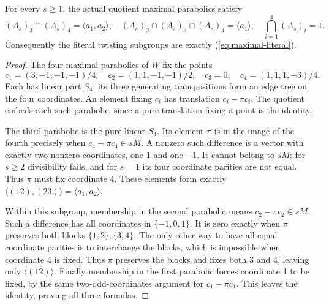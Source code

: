 \begin{lemma}\label{lem:literal}
For every $s\geq1$, the actual quotient maximal parabolics satisfy
\[
 (A_s)_3\cap(A_s)_4=\langle a_1,a_2\rangle,\quad
 (A_s)_2\cap(A_s)_3\cap(A_s)_4=\langle a_1\rangle,\quad
 \bigcap_{i=1}^4(A_s)_i=1.
\]
Consequently the literal twisting subgroups are exactly
(\ref{eq:maximal-literal}).
\end{lemma}
\begin{proof}
The four maximal parabolics of $W$ fix the points
\[
 c_1=(3,-1,-1,-1)/4,\quad c_2=(1,1,-1,-1)/2,
 \quad c_3=0,\quad c_4=(1,1,1,-3)/4.
\]
Each has linear part $S_4$: its three generating transpositions form
an edge tree on the four coordinates. An element fixing $c_i$ has
translation $c_i-\pi c_i$. The quotient embeds each such parabolic,
since a pure translation fixing a point is the identity.

The third parabolic is the pure linear $S_4$. Its element $\pi$
is in the image of the fourth precisely when
$c_4-\pi c_4\in sM$. A nonzero such difference is a vector with
exactly two nonzero coordinates, one $1$ and one $-1$. It cannot
belong to $sM$: for $s\geq2$ divisibility fails, and for $s=1$
its four coordinate parities are not equal. Thus $\pi$ must fix
coordinate 4. These elements form exactly
$\langle(12),(23)\rangle=\langle a_1,a_2\rangle$.

Within this subgroup, membership in the second parabolic means
$c_2-\pi c_2\in sM$. Such a difference has all coordinates in
$\{-1,0,1\}$. It is zero exactly when $\pi$ preserves both
blocks $\{1,2\},\{3,4\}$. The only other way to have all
equal coordinate parities is to interchange the blocks, which is
impossible when coordinate 4 is fixed. Thus $\pi$ preserves the
blocks and fixes both 3 and 4, leaving only $\langle(12)\rangle$.
Finally membership in the first parabolic forces coordinate 1 to
be fixed, by the same two-odd-coordinates argument for
$c_1-\pi c_1$. This leaves the identity, proving all three formulas.
\end{proof}

